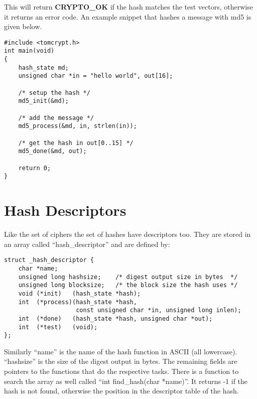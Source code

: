 \documentclass[a4paper]{book}
\begin{document}
This will return {\bf CRYPTO\_OK} if the hash matches the test vectors, otherwise it returns an error code.  An
example snippet that hashes a message with md5 is given below.
\begin{small}
\begin{verbatim}
#include <tomcrypt.h>
int main(void)
{
    hash_state md;
    unsigned char *in = "hello world", out[16];

    /* setup the hash */
    md5_init(&md);

    /* add the message */
    md5_process(&md, in, strlen(in));

    /* get the hash in out[0..15] */
    md5_done(&md, out);

    return 0;
}
\end{verbatim}
\end{small}

\section{Hash Descriptors}
Like the set of ciphers the set of hashes have descriptors too.  They are stored in an array called ``hash\_descriptor'' and
are defined by:
\begin{verbatim}
struct _hash_descriptor {
    char *name;
    unsigned long hashsize;    /* digest output size in bytes  */
    unsigned long blocksize;   /* the block size the hash uses */
    void (*init)   (hash_state *hash);
    int  (*process)(hash_state *hash, 
                    const unsigned char *in, unsigned long inlen);
    int  (*done)   (hash_state *hash, unsigned char *out);
    int  (*test)   (void);
};
\end{verbatim}

Similarly ``name'' is the name of the hash function in ASCII (all lowercase).  ``hashsize'' is the size of the digest output
in bytes.  The remaining fields are pointers to the functions that do the respective tasks.  There is a function to
search the array as well called ``int find\_hash(char *name)''.  It returns -1 if the hash is not found, otherwise the
position in the descriptor table of the hash.
\end{document}
